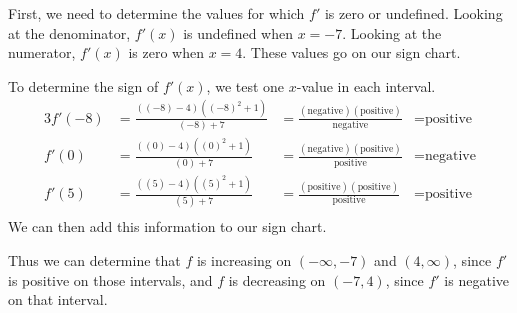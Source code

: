\documentclass{article}
\begin{document}
\begin{enumerate}
  \begin{solution}
    First, we need to determine the values for which $f'$ is zero or undefined.
    Looking at the denominator, $f'(x)$ is undefined when $x=-7$. Looking at the numerator,
    $f'(x)$ is zero when $x=4$. These values go on our sign chart.
      \begin{center}
      \end{center}
      To determine the sign of $f'(x)$, we test one $x$-value in each interval.
      \begin{alignat*}{3}
      f'(-8) &= \frac{((-8)-4)((-8)^2+1)}{(-8)+7} &= 
      \frac{(\text{negative})(\text{positive})}{\text{negative}} &= \text{positive} \\
      f'(0) &= \frac{((0)-4)((0)^2+1)}{(0)+7} &= 
      \frac{(\text{negative})(\text{positive})}{\text{positive}} &= \text{negative} \\
      f'(5) &= \frac{((5)-4)((5)^2+1)}{(5)+7} &= 
      \frac{(\text{positive})(\text{positive})}{\text{positive}} &= \text{positive} \\
      \end{alignat*}
      We can then add this information to our sign chart.
      \begin{center}
      \end{center}

      Thus we can determine that $f$ is increasing on $(-\infty, -7)$ and $(4, \infty)$,
      since $f'$ is positive on those intervals, and $f$ is decreasing on $(-7, 4)$, since
      $f'$ is negative on that interval.
      

\end{solution}
\end{enumerate}
\end{document}
